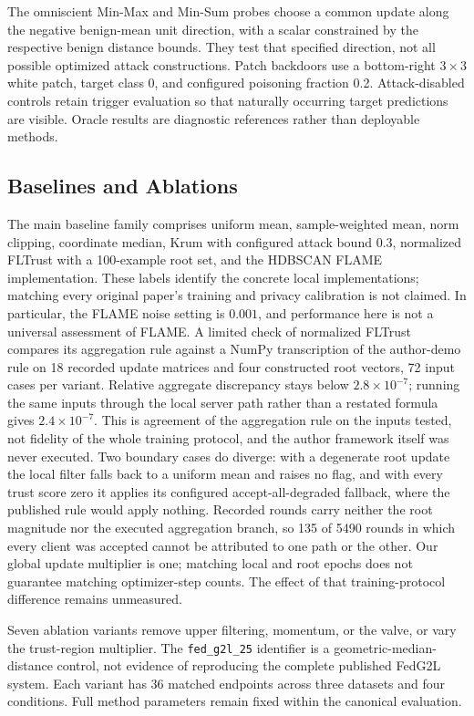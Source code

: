 \documentclass[journal]{IEEEtran}
\begin{document}
The omniscient Min-Max and Min-Sum probes choose a common update along the negative benign-mean unit direction, with a scalar constrained by the respective benign distance bounds. They test that specified direction, not all possible optimized attack constructions. Patch backdoors use a bottom-right $3\times3$ white patch, target class 0, and configured poisoning fraction 0.2. Attack-disabled controls retain trigger evaluation so that naturally occurring target predictions are visible. Oracle results are diagnostic references rather than deployable methods.

\subsection{Baselines and Ablations}
The main baseline family comprises uniform mean, sample-weighted mean, norm clipping, coordinate median, Krum with configured attack bound 0.3, normalized FLTrust with a 100-example root set, and the HDBSCAN FLAME implementation. These labels identify the concrete local implementations; matching every original paper's training and privacy calibration is not claimed. In particular, the FLAME noise setting is $0.001$, and performance here is not a universal assessment of FLAME. A limited check of normalized FLTrust compares its aggregation rule against a NumPy transcription of the author-demo rule on 18 recorded update matrices and four constructed root vectors, 72 input cases per variant. Relative aggregate discrepancy stays below $2.8\times10^{-7}$; running the same inputs through the local server path rather than a restated formula gives $2.4\times10^{-7}$. This is agreement of the aggregation rule on the inputs tested, not fidelity of the whole training protocol, and the author framework itself was never executed. Two boundary cases do diverge: with a degenerate root update the local filter falls back to a uniform mean and raises no flag, and with every trust score zero it applies its configured accept-all-degraded fallback, where the published rule would apply nothing. Recorded rounds carry neither the root magnitude nor the executed aggregation branch, so 135 of 5490 rounds in which every client was accepted cannot be attributed to one path or the other. Our global update multiplier is one; matching local and root epochs does not guarantee matching optimizer-step counts. The effect of that training-protocol difference remains unmeasured.

Seven ablation variants remove upper filtering, momentum, or the valve, or vary the trust-region multiplier. The \texttt{fed\_g2l\_25} identifier is a geometric-median-distance control, not evidence of reproducing the complete published FedG2L system. Each variant has 36 matched endpoints across three datasets and four conditions. Full method parameters remain fixed within the canonical evaluation.
\end{document}
